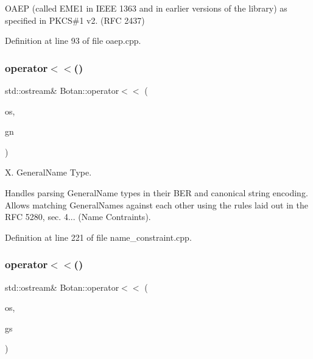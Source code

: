 O\+A\+EP (called E\+M\+E1 in I\+E\+EE 1363 and in earlier versions of the library) as specified in P\+K\+CS\#1 v2. (R\+FC 2437) 

Definition at line 93 of file oaep.\+cpp.

\mbox{\label{namespace_botan_a253008bbfcdaedb01ffa8cc88fd1b168}} 
\subsubsection{\texorpdfstring{operator$<$$<$()}{operator<<()}\hspace{0.1cm}{\footnotesize\ttfamily [1/2]}}
{\footnotesize\ttfamily std\+::ostream\& Botan\+::operator$<$$<$ (\begin{DoxyParamCaption}\item[{std\+::ostream \&}]{os,  }\item[{const General\+Name \&}]{gn }\end{DoxyParamCaption})}



X. General\+Name Type. 

Handles parsing General\+Name types in their B\+ER and canonical string encoding. Allows matching General\+Names against each other using the rules laid out in the R\+FC 5280, sec. 4... (Name Contraints). 

Definition at line 221 of file name\+\_\+constraint.\+cpp.

\mbox{\label{namespace_botan_a4139683b6cc649ac5a8b6da64dcd60c8}} 
\subsubsection{\texorpdfstring{operator$<$$<$()}{operator<<()}\hspace{0.1cm}{\footnotesize\ttfamily [2/2]}}
{\footnotesize\ttfamily std\+::ostream\& Botan\+::operator$<$$<$ (\begin{DoxyParamCaption}\item[{std\+::ostream \&}]{os,  }\item[{const General\+Subtree \&}]{gs }\end{DoxyParamCaption})}



